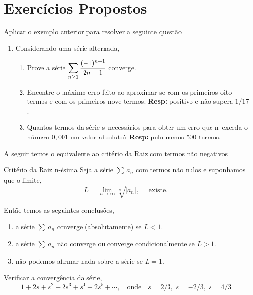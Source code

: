 \section*{Exercícios Propostos}
Aplicar o exemplo anterior para resolver a
seguinte quest\~{a}o
\begin{enumerate}[label=\rm{(\arabic*)}]
  \item Considerando uma s\'{e}rie alternada,
\begin{enumerate}
  \item Prove a s\'erie
  $\displaystyle{\sum_{n\geq1}\frac{(-1)^{n+1}}{2n-1}}$ converge.
  \item Encontre o m\'aximo erro feito ao aproximar-se com os primeiros
  oito termos e com os primeiros nove termos. \hfill \textbf{ Resp:} positivo e n\~{a}o supera $1/17$.
  \item Quantos termos da s\'erie s\ao\ necess\'arios para obter
  um erro que n\ao\ exceda o n\'umero $0,001$ em valor absoluto?
 \hfill \textbf{ Resp:} pelo menos 500 termos.
\end{enumerate}
\end{enumerate}

A seguir temos o equivalente ao crit\'{e}rio da Raiz com termos n\~{a}o
 negativos

\begin{theoc}{Crit\'{e}rio da Raiz n-\'{e}sima}{}
  Seja a s\'{e}rie $\sum_{}\,a_{n}$ com termos n\~{a}o nulos
e suponhamos que o limite,
\begin{equation*}
  L=\lim_{n\to\infty}\sqrt[n]{|a_n|},\quad \text{ existe. }
\end{equation*}

Ent\~{a}o temos as seguintes conclus\~{o}es,
\begin{enumerate}[label=\rm{(\alph*)},leftmargin=4em,ref=\rm{(\alph*)}]
  \item a s\'{e}rie $\sum_{}\,a_{n}$ converge (absolutamente) se $L<1$.
  \item a s\'{e}rie $\sum_{}\,a_{n}$ n\~{a}o converge ou converge condicionalmente se $L>1$.
  \item n\~{a}o podemos afirmar nada sobre a s\'{e}rie se $L=1$.
\end{enumerate}
\end{theoc}

\begin{exer}
Verificar a converg\^{e}ncia da s\'{e}rie,
\begin{equation*}
  1+2s+s^2+2s^3+s^4+2s^5+\cdots,\quad \text{onde}\quad
  s=2/3,\;s=-2/3,\;s=4/3.
\end{equation*}
\end{exer}

